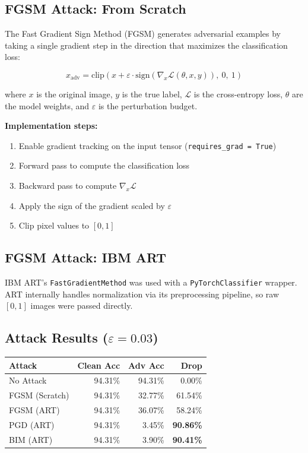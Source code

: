 \documentclass[12pt,a4paper]{article}
\begin{document}
\subsection{FGSM Attack: From Scratch}

The Fast Gradient Sign Method (FGSM) \cite{goodfellow2014} generates adversarial
examples by taking a single gradient step in the direction that maximizes the
classification loss:

\begin{equation}
    x_{\text{adv}} = \text{clip}\left( x + \varepsilon \cdot
    \text{sign}\left( \nabla_x \mathcal{L}(\theta, x, y) \right),\ 0,\ 1 \right)
\end{equation}

where $x$ is the original image, $y$ is the true label, $\mathcal{L}$ is the
cross-entropy loss, $\theta$ are the model weights, and $\varepsilon$ is the
perturbation budget.

\textbf{Implementation steps:}
\begin{enumerate}
    \item Enable gradient tracking on the input tensor (\texttt{requires\_grad = True})
    \item Forward pass to compute the classification loss
    \item Backward pass to compute $\nabla_x \mathcal{L}$
    \item Apply the sign of the gradient scaled by $\varepsilon$
    \item Clip pixel values to $[0, 1]$
\end{enumerate}

\subsection{FGSM Attack: IBM ART}

IBM ART's \texttt{FastGradientMethod} was used with a
\texttt{PyTorchClassifier} wrapper. ART internally handles normalization via its
preprocessing pipeline, so raw $[0, 1]$ images were passed directly.

\subsection{Attack Results ($\varepsilon = 0.03$)}

\begin{center}
\begin{tabular}{lrrr}
\toprule
\textbf{Attack} & \textbf{Clean Acc} & \textbf{Adv Acc} & \textbf{Drop} \\
\midrule
No Attack       & 94.31\% & 94.31\% &  0.00\% \\
FGSM (Scratch)  & 94.31\% & 32.77\% & 61.54\% \\
FGSM (ART)      & 94.31\% & 36.07\% & 58.24\% \\
PGD  (ART)      & 94.31\% &  3.45\% & \textbf{90.86\%} \\
BIM  (ART)      & 94.31\% &  3.90\% & \textbf{90.41\%} \\
\bottomrule
\end{tabular}
\end{center}
\end{document}
